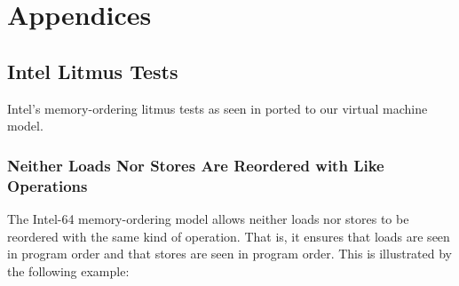 \appendix

\section*{Appendices}

\renewcommand{\thesubsection}{\Alph{subsection}}

\renewcommand{\tablename}{Example}

\subsection{Intel Litmus Tests}

Intel's memory-ordering litmus tests as seen in \cite[Section 8.2.3]{ref:Intel} ported to our virtual machine model.





\subsubsection*{Neither Loads Nor Stores Are Reordered with Like Operations}

The Intel-64 memory-ordering model allows neither loads nor stores to be reordered with the same kind of operation.
That is, it ensures that loads are seen in program order and that stores are seen in program order.
This is illustrated by the following example:

